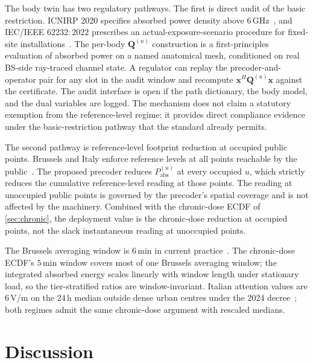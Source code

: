 \documentclass[journal,twocolumn,10pt]{IEEEtran}
\theoremstyle{plain}
\theoremstyle{remark}
\newcommand{\xx}{\mathbf{x}}
\newcommand{\Pabs}{P_{\mathrm{abs}}}
\newcommand{\Qmat}{\mathbf{Q}}
\begin{document}
The body twin has two regulatory pathways. The first is direct
audit of the basic restriction. ICNIRP 2020 specifies absorbed
power density above $6\,$GHz~\cite{ICNIRP2020}, and IEC/IEEE
$62232:2022$ prescribes an actual-exposure-scenario procedure for
fixed-site installations~\cite{IEC62232}. The per-body
$\Qmat^{(u)}$ construction is a first-principles evaluation of
absorbed power on a named anatomical mesh, conditioned on real
BS-side ray-traced channel state. A regulator can replay the
precoder-and-operator pair for any slot in the audit window and
recompute $\xx^H \Qmat^{(u)} \xx$ against the certificate. The
audit interface is open if the path dictionary, the body model, and
the dual variables are logged. The mechanism does not claim a
statutory exemption from the reference-level regime: it provides
direct compliance evidence under the basic-restriction pathway that
the standard already permits.

The second pathway is reference-level footprint reduction at
occupied public points. Brussels and Italy enforce reference levels
at all points reachable by the public~\cite{BrusselsArrete2007,ItalyDL}.
The proposed precoder reduces $\Pabs^{(u)}$ at every occupied $u$,
which strictly reduces the cumulative reference-level reading at
those points. The reading at unoccupied public points is governed by
the precoder's spatial coverage and is not affected by the
machinery. Combined with the chronic-dose ECDF of \cref{sec:chronic},
the deployment value is the chronic-dose reduction at occupied
points, not the slack instantaneous reading at unoccupied points.

The Brussels averaging window is $6\,$min in current
practice~\cite{BrusselsArrete2024}. The chronic-dose ECDF's
$5\,$min window covers most of one Brussels averaging window;
the integrated absorbed energy scales linearly with window length
under stationary load, so the tier-stratified ratios are
window-invariant. Italian attention values are $6\,$V/m on the
$24\,$h median outside dense urban centres under the 2024
decree~\cite{ItalyDL}; both regimes admit the same chronic-dose
argument with rescaled medians.


\section{Discussion}\label{sec:discussion}
\end{document}
